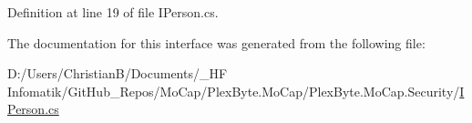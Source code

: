 Definition at line 19 of file I\+Person.\+cs.



The documentation for this interface was generated from the following file\+:\begin{DoxyCompactItemize}
\item 
D\+:/\+Users/\+Christian\+B/\+Documents/\+\_\+\+H\+F Infomatik/\+Git\+Hub\+\_\+\+Repos/\+Mo\+Cap/\+Plex\+Byte.\+Mo\+Cap/\+Plex\+Byte.\+Mo\+Cap.\+Security/\hyperlink{_i_person_8cs}{I\+Person.\+cs}\end{DoxyCompactItemize}
